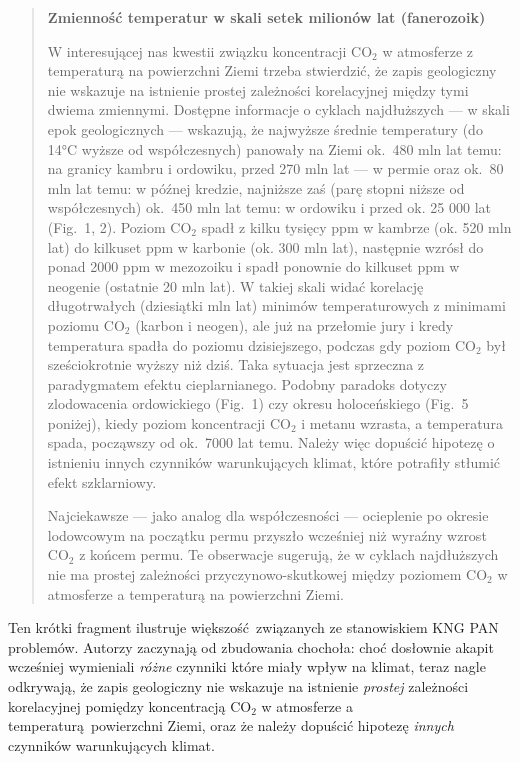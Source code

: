 \documentclass[12pt]{article}
\begin{document}
\begin{quotation}
	\textbf{Zmienność temperatur w skali setek milionów lat (fanerozoik)}
	
	W interesującej nas kwestii związku koncentracji CO$_2$ w atmosferze z temperaturą na powierzchni Ziemi trzeba stwierdzić, że zapis geologiczny nie wskazuje na istnienie prostej zależności korelacyjnej między tymi dwiema zmiennymi. Dostępne informacje o cyklach najdłuższych --- w skali epok geologicznych --- wskazują, że najwyższe średnie temperatury (do 14\si{\celsius} wyższe od współczesnych) panowały na Ziemi ok.~480 mln lat temu: na granicy kambru i ordowiku, przed 270 mln lat --- w permie oraz ok.~80 mln lat temu: w późnej kredzie, najniższe zaś (parę stopni niższe od współczesnych) ok.~450 mln lat temu: w  ordowiku i przed ok. 25 000 lat (Fig.~1, 2). Poziom CO$_2$ spadł z kilku tysięcy ppm w kambrze (ok. 520 mln lat) do kilkuset ppm w karbonie (ok. 300 mln lat), następnie wzrósł do ponad 2000 ppm w mezozoiku i spadł ponownie do kilkuset ppm w neogenie (ostatnie 20 mln lat). W takiej skali widać korelację długotrwałych (dziesiątki mln lat) minimów temperaturowych z minimami poziomu CO$_2$ (karbon i neogen), ale już na przełomie jury i kredy temperatura spadła do poziomu dzisiejszego, podczas gdy poziom CO$_2$ był sześciokrotnie wyższy niż dziś. Taka sytuacja jest sprzeczna z paradygmatem efektu cieplarnianego. Podobny paradoks dotyczy zlodowacenia ordowickiego (Fig.~1) czy okresu holoceńskiego (Fig.~5 poniżej), kiedy poziom koncentracji CO$_2$ i metanu wzrasta, a temperatura spada, począwszy od ok.~7000 lat temu. Należy  więc dopuścić hipotezę o istnieniu innych czynników warunkujących klimat, które potrafiły stłumić efekt szklarniowy.

	Najciekawsze --- jako analog dla współczesności --- ocieplenie po okresie lodowcowym na początku permu przyszło wcześniej niż wyraźny wzrost CO$_2$ z końcem permu. Te obserwacje sugerują, że w cyklach najdłuższych nie ma prostej zależności przyczynowo-skutkowej między poziomem CO$_2$ w atmosferze a temperaturą na powierzchni Ziemi.
\end{quotation}

Ten krótki fragment ilustruje większość związanych ze stanowiskiem KNG PAN problemów. Autorzy zaczynają od zbudowania chochoła: choć dosłownie akapit wcześniej wymieniali \emph{różne} czynniki które miały wpływ na klimat, teraz nagle odkrywają, że zapis geologiczny nie wskazuje na istnienie \emph{prostej} zależności korelacyjnej pomiędzy koncentracją CO$_2$ w atmosferze a temperaturą powierzchni Ziemi, oraz że należy dopuścić hipotezę \emph{innych} czynników warunkujących klimat.
\end{document}
